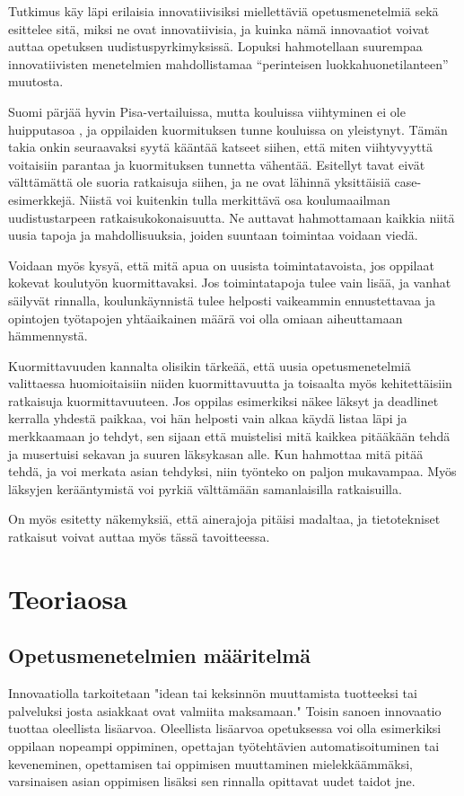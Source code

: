 \documentclass[utf8,bachelor]{gradu3}
\begin{document}
Tutkimus käy läpi erilaisia innovatiivisiksi miellettäviä opetusmenetelmiä sekä esittelee sitä, miksi ne ovat innovatiivisia, ja kuinka nämä innovaatiot voivat auttaa opetuksen uudistuspyrkimyksissä. Lopuksi hahmotellaan suurempaa innovatiivisten menetelmien mahdollistamaa “perinteisen luokkahuonetilanteen” muutosta.

Suomi pärjää hyvin Pisa-vertailuissa, mutta kouluissa viihtyminen ei ole huipputasoa \parencite[][]{kouluViihtyvyys}, ja oppilaiden kuormituksen tunne kouluissa on yleistynyt. \parencite [][]{oppilaidenKuormitus} Tämän takia onkin seuraavaksi syytä kääntää katseet siihen, että miten viihtyvyyttä voitaisiin parantaa ja kuormituksen tunnetta vähentää. Esitellyt tavat eivät välttämättä ole suoria ratkaisuja siihen, ja ne ovat lähinnä yksittäisiä case-esimerkkejä. Niistä voi kuitenkin tulla merkittävä osa koulumaailman uudistustarpeen ratkaisukokonaisuutta. Ne auttavat hahmottamaan kaikkia niitä uusia tapoja ja mahdollisuuksia, joiden suuntaan toimintaa voidaan viedä. 

Voidaan myös kysyä, että mitä apua on uusista toimintatavoista, jos oppilaat kokevat koulutyön kuormittavaksi. Jos toimintatapoja tulee vain lisää, ja vanhat säilyvät rinnalla, koulunkäynnistä tulee helposti vaikeammin ennustettavaa ja opintojen työtapojen yhtäaikainen määrä voi olla omiaan aiheuttamaan hämmennystä.

Kuormittavuuden kannalta olisikin tärkeää, että uusia opetusmenetelmiä valittaessa huomioitaisiin niiden kuormittavuutta ja toisaalta myös kehitettäisiin ratkaisuja kuormittavuuteen. Jos oppilas esimerkiksi näkee läksyt ja deadlinet kerralla yhdestä paikkaa, voi hän helposti vain alkaa käydä listaa läpi ja merkkaamaan jo tehdyt, sen sijaan että muistelisi mitä kaikkea pitääkään tehdä ja musertuisi sekavan ja suuren läksykasan alle. Kun hahmottaa mitä pitää tehdä, ja voi merkata asian tehdyksi, niin työnteko on paljon mukavampaa. Myös läksyjen kerääntymistä voi pyrkiä välttämään samanlaisilla ratkaisuilla.

On myös esitetty näkemyksiä, että ainerajoja pitäisi madaltaa, ja tietotekniset ratkaisut voivat auttaa myös tässä tavoitteessa.

\chapter{Teoriaosa}
\section{Opetusmenetelmien määritelmä}
Innovaatiolla tarkoitetaan "idean tai keksinnön muuttamista tuotteeksi tai palveluksi josta asiakkaat ovat valmiita maksamaan." \parencite[][]{innovaatio} Toisin sanoen innovaatio tuottaa oleellista lisäarvoa. Oleellista lisäarvoa opetuksessa voi olla esimerkiksi oppilaan nopeampi oppiminen, opettajan työtehtävien automatisoituminen tai keveneminen, opettamisen tai oppimisen muuttaminen mielekkäämmäksi, varsinaisen asian oppimisen lisäksi sen rinnalla opittavat uudet taidot jne.
\end{document}
